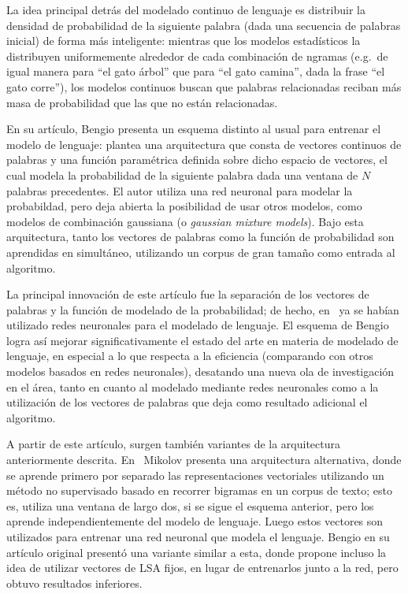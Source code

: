 La idea principal detrás del modelado continuo de lenguaje es distribuir la densidad de probabilidad de
la siguiente palabra (dada una secuencia de palabras inicial) de forma más inteligente: mientras que
los modelos estadísticos la distribuyen uniformemente alrededor de cada combinación de ngramas
(e.g.\ de igual manera para ``el gato árbol'' que para ``el gato camina'', dada la frase ``el gato
corre''), los modelos continuos buscan que palabras relacionadas reciban más masa de probabilidad
que las que no están relacionadas.

En su artículo, Bengio presenta un esquema distinto al usual para entrenar el modelo de lenguaje:
plantea una arquitectura que consta de vectores continuos de palabras y una función paramétrica
definida sobre dicho espacio de vectores, el cual modela la probabilidad de la siguiente palabra
dada una ventana de $N$ palabras precedentes. El autor utiliza una red neuronal para modelar la
probabildad, pero deja abierta la posibilidad de usar otros modelos, como modelos de combinación gaussiana
(o \textit{gaussian mixture models}). Bajo esta arquitectura, tanto los vectores de palabras como la
función de probabilidad son aprendidas en simultáneo, utilizando un corpus de gran tamaño como
entrada al algoritmo.

La principal innovación de este artículo fue la separación de los vectores de palabras y la función
de modelado de la probabilidad; de hecho, en~\cite{MiikkulainenDyer1991} ya se habían utilizado
redes neuronales para el modelado de lenguaje. El esquema de Bengio logra así mejorar
significativamente el estado del arte en materia de modelado de lenguaje, en especial a lo que
respecta a la eficiencia (comparando con otros modelos basados en redes neuronales), desatando una
nueva ola de investigación en el área, tanto en cuanto al modelado mediante redes neuronales como a
la utilización de los vectores de palabras que deja como resultado adicional el algoritmo.


A partir de este artículo, surgen también variantes de la arquitectura anteriormente
descrita. En~\cite{Mikolov2007, Mikolov2009} Mikolov presenta una arquitectura alternativa, donde se
aprende primero por separado las representaciones vectoriales utilizando un método no supervisado
basado en recorrer bigramas en un corpus de texto; esto es, utiliza una ventana de largo dos, si se
sigue el esquema anterior, pero los aprende independientemente del modelo de lenguaje. Luego estos
vectores son utilizados para entrenar una red neuronal que modela el lenguaje. Bengio en su artículo
original presentó una variante similar a esta, donde propone incluso la idea de utilizar vectores de
LSA fijos, en lugar de entrenarlos junto a la red, pero obtuvo resultados inferiores.


